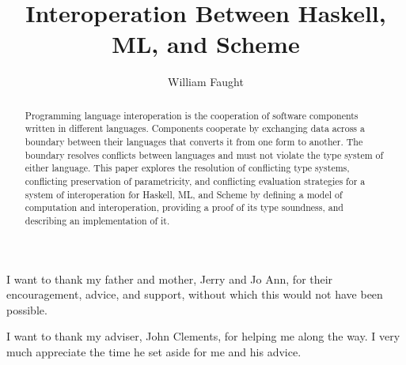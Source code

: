 \documentclass[12pt]{ucthesis}
\begin{document}
\title{Interoperation Between Haskell, ML, and Scheme}
\author{William Faught}
\maketitle

\begin{frontmatter}

\copyrightpage
\approvalpage
\begin{abstract}
Programming language interoperation is the cooperation of software components written in different languages.  Components cooperate by exchanging data across a boundary between their languages that converts it from one form to another.  The boundary resolves conflicts between languages and must not violate the type system of either language.  This paper explores the resolution of conflicting type systems, conflicting preservation of parametricity, and conflicting evaluation strategies for a system of interoperation for Haskell, ML, and Scheme by defining a model of computation and interoperation, providing a proof of its type soundness, and describing an implementation of it.
\end{abstract}
\begin{acknowledgements}
\indent\indent I want to thank my father and mother, Jerry and Jo Ann, for their encouragement, advice, and support, without which this would not have been possible.

I want to thank my adviser, John Clements, for helping me along the way.  I very much appreciate the time he set aside for me and his advice.
\end{acknowledgements}
\tableofcontents{}
\listoffigures

\end{frontmatter}

\pagestyle{plain}
\renewcommand{\baselinestretch}{1.66}









\clearpage


\end{document}
